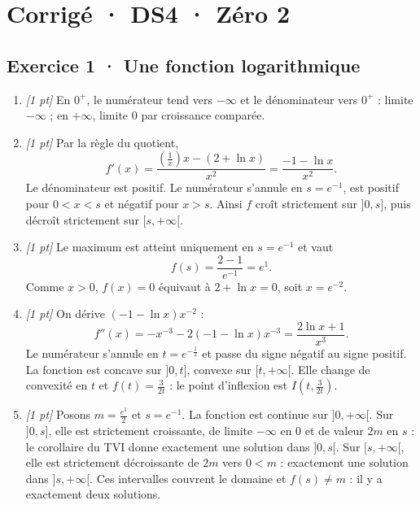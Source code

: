 \ifmxteacher\mxnewpage

\section*{Corrigé · DS4 · Zéro 2}\label{cor:6-2}

\subsection*{Exercice 1 · Une fonction logarithmique}\begin{enumerate}

\item \textit{[1 pt]} En $0^+$, le numérateur tend vers $-\infty$ et le dénominateur vers $0^+$ : limite $-\infty$ ; en $+\infty$, limite $0$ par croissance comparée.

\item \textit{[1 pt]} Par la règle du quotient,
\[f'(x)=\frac{(\frac{1}{x})x-(2+\ln x)}{x^2}=\frac{-1-\ln x}{x^2}.\]
Le dénominateur est positif. Le numérateur s'annule en $s=e^{-1}$, est positif pour $0<x<s$ et négatif pour $x>s$. Ainsi $f$ croît strictement sur $]0,s]$, puis décroît strictement sur $[s,+\infty[$.

\item \textit{[1 pt]} Le maximum est atteint uniquement en $s=e^{-1}$ et vaut
\[f(s)=\frac{2- 1}{e^{-1}}=e^{1}.\]
Comme $x>0$, $f(x)=0$ équivaut à $2+\ln x=0$, soit $x=e^{-2}$.

\item \textit{[1 pt]} On dérive $(-1-\ln x)x^{-2}$ :
\[f''(x)=-x^{-3}-2(-1-\ln x)x^{-3}=\frac{2\ln x+1}{x^3}.\]
Le numérateur s'annule en $t=e^{-\frac{1}{2}}$ et passe du signe négatif au signe positif. La fonction est concave sur $]0,t]$, convexe sur $[t,+\infty[$. Elle change de convexité en $t$ et $f(t)=\frac{3}{2t}$ : le point d'inflexion est $I(t,\frac{3}{2t})$.

\item \textit{[1 pt]} Posons $m=\frac{e^{1}}{2}$ et $s=e^{-1}$. La fonction est continue sur $]0,+\infty[$. Sur $]0,s]$, elle est strictement croissante, de limite $-\infty$ en $0$ et de valeur $2m$ en $s$ : le corollaire du TVI donne exactement une solution dans $]0,s[$. Sur $[s,+\infty[$, elle est strictement décroissante de $2m$ vers $0<m$ : exactement une solution dans $]s,+\infty[$. Ces intervalles couvrent le domaine et $f(s)\ne m$ : il y a exactement deux solutions.

\end{enumerate}

